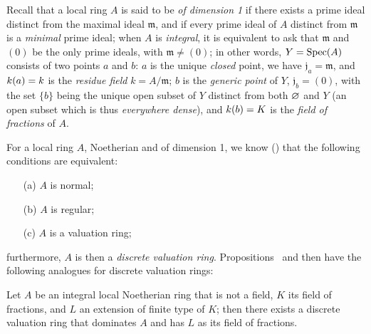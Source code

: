\begin{env}[7.1.5]
\label{II.7.1.5}
Recall that a local ring $A$ is said to be \emph{of dimension 1} if there exists a prime ideal distinct from the maximal ideal $\mathfrak{m}$, and if every prime ideal of $A$ distinct from $\mathfrak{m}$ is a \emph{minimal} prime ideal;
when $A$ is \emph{integral}, it is equivalent to ask that $\mathfrak{m}$ and $(0)$ be the only prime ideals, with $\mathfrak{m}\neq(0)$;
in other words, $Y=\operatorname{Spec}(A)$ consists of two
points $a$ and $b$: $a$ is the unique \emph{closed} point, we have $\mathfrak{j}_a=\mathfrak{m}$, and $k(a)=k$ is the \emph{residue field} $k=A/\mathfrak{m}$;
$b$ is the \emph{generic point} of $Y$, $\mathfrak{j}_b=(0)$, with the set $\{b\}$ being the unique open subset of $Y$ distinct from both $\varnothing$ and $Y$ (an open subset which is thus \emph{everywhere dense}), and $k(b)=K$ is the \emph{field of fractions} of $A$.
\end{env}

\begin{env}[7.1.6]
\label{II.7.1.6}
For a local ring $A$, Noetherian and of dimension 1, we know (\cite[pp.~2-08 and 17-01]{I-1}) that the following conditions are equivalent:
\begin{enumerate}
    \item[\rm{(a)}] $A$ is normal;
    \item[\rm{(b)}] $A$ is regular;
    \item[\rm{(c)}] $A$ is a valuation ring;
\end{enumerate}
furthermore, $A$ is then a \emph{discrete valuation ring}.
Propositions~ and  then have the following analogues for discrete valuation rings:
\end{env}

\begin{proposition}[7.1.7]
\label{II.7.1.7}
Let $A$ be an integral local Noetherian ring that is not a field, $K$ its field of fractions, and $L$ an extension of finite type of $K$;
then there exists a discrete valuation ring that dominates $A$ and has $L$ as its field of fractions.
\end{proposition}

